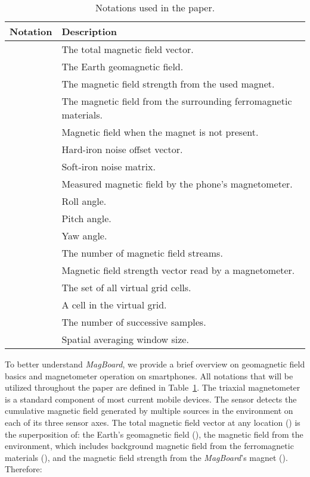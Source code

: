 \documentclass[conference]{IEEEtran}
\def \sys {\textit{MagBoard}}
\begin{document}
\begin{table}[!t]
    \centering
    \begin{tabular}{|l|p{6.5cm}|} \hline
      \textbf{Notation} & \textbf{Description} \\ \hline \hline
       &  The total magnetic field vector.\\ \hline 
       &  The Earth geomagnetic field. \\ \hline
       & The magnetic field strength from the used magnet. \\ \hline
       & The magnetic field from the surrounding ferromagnetic materials.\\ \hline
       & Magnetic field when the magnet is not present.\\ \hline
       & Hard-iron noise offset vector. \\ \hline
       & Soft-iron noise matrix. \\ \hline
       & Measured magnetic field by the phone's magnetometer.\\ \hline
       & Roll angle. \\ \hline
       & Pitch angle. \\ \hline
       & Yaw angle. \\ \hline
        & The number of magnetic field streams. \\ \hline
        & Magnetic field strength vector read by a magnetometer. \\ \hline
        & The set of all virtual grid cells. \\ \hline
        & A cell in the virtual grid.\\ \hline
        & The number of successive samples. \\ \hline
        & Spatial averaging window size. \\ \hline

  \end{tabular}
    \caption{Notations used in the paper.}
    \label{tab:notations}
    \vspace{-0.2in}
\end{table}

To better understand \sys{}, we provide a brief overview on geomagnetic field basics and magnetometer operation on smartphones. All notations that will be utilized throughout the paper are defined in Table~\ref{tab:notations}. The triaxial magnetometer is a standard component of most current mobile devices. 
The sensor detects the cumulative magnetic field generated by multiple sources in the environment on each of its three sensor axes. The total magnetic field vector at any location () is the superposition of: the Earth's geomagnetic field (), the magnetic field from the environment, which includes background magnetic field from the ferromagnetic materials (), and the magnetic field strength from the \sys{}'s magnet (). Therefore:
\end{document}
